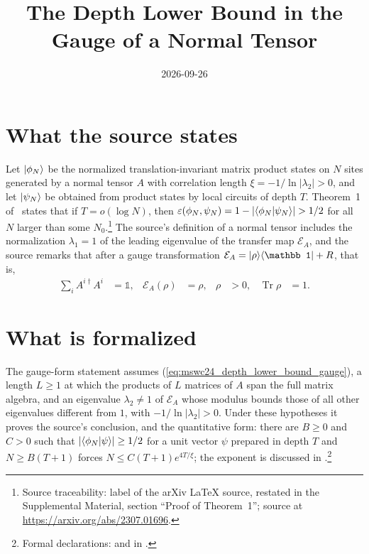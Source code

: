 \documentclass{article}
\title{The Depth Lower Bound in the Gauge of a Normal Tensor}
\author{}
\date{2026-09-26}
\begin{document}
\maketitle
{}

\section{What the source states}
Let $|\phi_N\rangle$ be the normalized translation-invariant matrix product
states on $N$ sites generated by a normal tensor $A$ with correlation length
$\xi=-1/\ln\lvert\lambda_2\rvert>0$, and let $|\psi_N\rangle$ be obtained from
product states by local circuits of depth $T$. Theorem~1
of~\cite{Malz2024Preparation} states that if $T=o(\log N)$, then
$\varepsilon(\phi_N,\psi_N)=1-\lvert\langle \phi_N | \psi_N \rangle\rvert>1/2$ for all
$N$ larger than some $N_0$.\footnote{Source traceability: label 
    of the arXiv LaTeX source, restated in the Supplemental Material, section
    ``Proof of Theorem~1''; source at
    \url{https://arxiv.org/abs/2307.01696}.} The source's definition of a normal
tensor includes the normalization $\lambda_1=1$ of the leading eigenvalue of
the transfer map $\mathcal E_A$, and the source remarks that after a gauge
transformation $\mathcal E_A=\ket{\rho}\bra{\mathbb 1}+R$, that is,
\begin{align}
    \sum_iA^{i\dagger}A^i & =\mathbb 1, &
    \mathcal E_A(\rho)    & =\rho,      &
    \rho                  & >0,         &
    \operatorname{Tr}\rho & =1.
    \label{eq:mswc24_depth_lower_bound_gauge}
\end{align}

\section{What is formalized}
The gauge-form statement assumes (\ref{eq:mswc24_depth_lower_bound_gauge}),
a length $L\ge1$ at which the products of $L$ matrices of $A$ span the full
matrix algebra, and an eigenvalue $\lambda_2\ne1$ of $\mathcal E_A$ whose
modulus bounds those of all other eigenvalues different from $1$, with
$-1/\ln\lvert\lambda_2\rvert>0$. Under these hypotheses it proves the source's
conclusion, and the quantitative form: there are $B\ge0$ and $C>0$ such that
$\lvert\langle \phi_N | \psi \rangle\rvert\ge1/2$ for a unit vector $\psi$ prepared in
depth $T$ and $N\ge B(T+1)$ forces $N\le C(T+1)e^{4T/\xi}$; the exponent is
discussed in
.\footnote{Formal
    declarations:
    and  in
    .}
\end{document}
